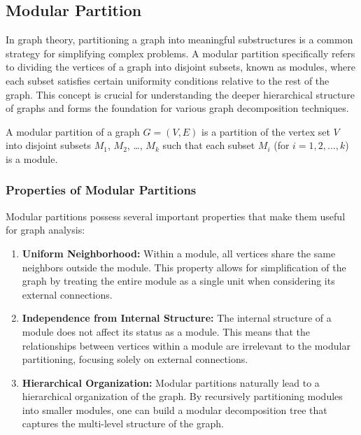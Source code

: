 \subsection*{Modular Partition}\label{subsec:modular-partition}

In graph theory, partitioning a graph into meaningful substructures is a common strategy for simplifying complex problems.
A modular partition specifically refers to dividing the vertices of a graph into disjoint subsets, known as modules, where each subset satisfies certain uniformity conditions relative to the rest of the graph.
This concept is crucial for understanding the deeper hierarchical structure of graphs and forms the foundation for various graph decomposition techniques.

\begin{mydef}
    A modular partition of a graph $G = (V, E)$ is a partition of the vertex set $V$ into disjoint subsets $M_1$, $M_2$, \ldots, $M_k$ such that each subset $M_i$ (for $i = 1, 2, \ldots, k$) is a module.
\end{mydef}

\subsubsection*{Properties of Modular Partitions}

Modular partitions possess several important properties that make them useful for graph analysis:

\begin{enumerate}
    \item \textbf{Uniform Neighborhood:} Within a module, all vertices share the same neighbors outside the module.
    This property allows for simplification of the graph by treating the entire module as a single unit when considering its external connections.
    \item \textbf{Independence from Internal Structure:} The internal structure of a module does not affect its status as a module.
    This means that the relationships between vertices within a module are irrelevant to the modular partitioning, focusing solely on external connections.
    \item \textbf{Hierarchical Organization:} Modular partitions naturally lead to a hierarchical organization of the graph.
    By recursively partitioning modules into smaller modules, one can build a modular decomposition tree that captures the multi-level structure of the graph.
\end{enumerate}

